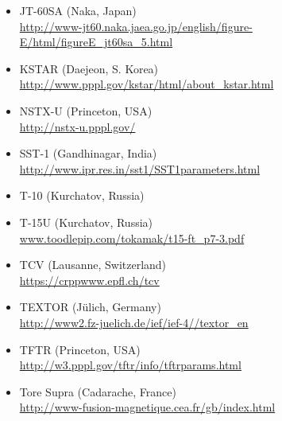 \begin{itemize}
\item{JT-60SA \scriptsize(Naka, Japan)\\ 
  \url{http://www-jt60.naka.jaea.go.jp/english/figure-E/html/figureE\_jt60sa\_5.html}}
  
\item{KSTAR \scriptsize(Daejeon, S. Korea)\\
  \url{http://www.pppl.gov/kstar/html/about\_kstar.html}}

\item{NSTX-U \scriptsize(Princeton, USA)\\
  \url{http://nstx-u.pppl.gov/}}
  
\item{SST-1 \scriptsize(Gandhinagar, India)\\
  \url{http://www.ipr.res.in/sst1/SST1parameters.html}}
  
\item{T-10 \scriptsize(Kurchatov, Russia)\\}
  
\item{T-15U \scriptsize(Kurchatov, Russia)\\
  \url{www.toodlepip.com/tokamak/t15-ft\_p7-3.pdf}}
  
\item{TCV \scriptsize(Lausanne, Switzerland)\\
  \url{https://crppwww.epfl.ch/tcv}}
  
\item{TEXTOR \scriptsize(J\"{u}lich, Germany)\\
  \url{http://www2.fz-juelich.de/ief/ief-4//textor\_en}}
  
\item{TFTR \scriptsize(Princeton, USA)\\
  \url{http://w3.pppl.gov/tftr/info/tftrparams.html}}
  
\item{Tore Supra \scriptsize(Cadarache, France)\\
    \url{http://www-fusion-magnetique.cea.fr/gb/index.html}}

\end{itemize}
\vfill



